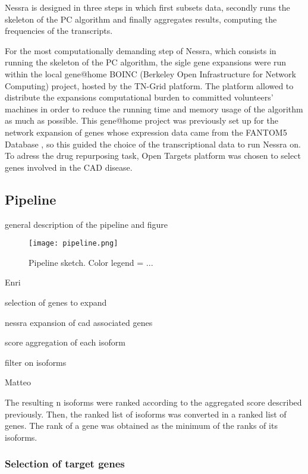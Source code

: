 \documentclass[fleqn,10pt]{SelfArx} %
\begin{document}
Nessra is designed in three steps in which first subsets data,
secondly runs the skeleton of the PC algorithm and finally aggregates results, computing the frequencies of the transcripts.

For the most computationally demanding step of Nessra, which consists in running the skeleton of the PC algorithm, the sigle gene expansions were run within the local gene@home \cite{boinc} BOINC (Berkeley Open Infrastructure for Network Computing) project, hosted by the TN-Grid platform. 
The platform allowed to distribute the expansions computational burden to committed volunteers' machines in order to reduce the running time and memory usage of the algorithm as much as possible.
This gene@home project was previously set up for the network expansion of genes whose expression data came from the FANTOM5 Database \cite{fantom}, so this guided the choice of the transcriptional data to run Nessra on.
To adress the drug repurposing task, Open Targets\cite{open} platform was chosen to select genes involved in the CAD disease.  


\subsection*{Pipeline}


general description of the pipeline and figure

\begin{figure}
	\texttt{[image: pipeline.png]}
	\caption{Pipeline sketch. Color legend = ...}
	\label{Fig:pipe}
\end{figure}

Enri

selection of genes to expand

nessra expansion of cad associated genes

score aggregation of each isoform

filter on isoforms

Matteo

The resulting n isoforms were ranked according to the aggregated score described previously. Then, the ranked list of isoforms was converted in a ranked list of genes. The rank of a gene was obtained as the minimum of the ranks of its isoforms.

\subsubsection{Selection of target genes}
\end{document}

